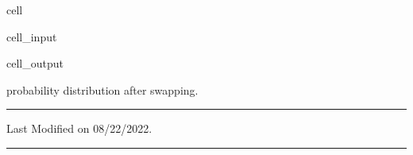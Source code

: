 \documentclass[letterpaper,10pt,english]{jupyterBook}
\begin{document}
\begin{sphinxuseclass}{cell}\begin{sphinxVerbatimInput}

\begin{sphinxuseclass}{cell_input}
\begin{sphinxVerbatim}[commandchars=\\\{\}]


  
   
    \PYG{p}{[}\PYG{p}{]}\PYG{p}{[}\PYG{p}{]}

\end{sphinxVerbatim}

\end{sphinxuseclass}\end{sphinxVerbatimInput}
\begin{sphinxVerbatimOutput}

\begin{sphinxuseclass}{cell_output}
\begin{sphinxVerbatim}[commandchars=\\\{\}]
probability distribution after swapping.
\end{sphinxVerbatim}

\noindent{}

\end{sphinxuseclass}\end{sphinxVerbatimOutput}

\end{sphinxuseclass}

\bigskip\hrule\bigskip


\sphinxAtStartPar
Last Modified on 08/22/2022.


\bigskip\hrule\bigskip
\end{document}
